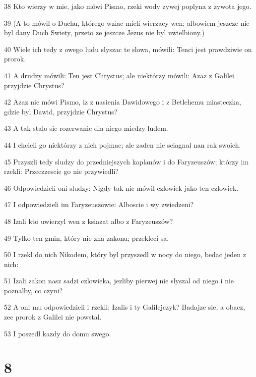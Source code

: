 \par 38 Kto wierzy w mie, jako mówi Pismo, rzeki wody zywej poplyna z zywota jego.
\par 39 (A to mówil o Duchu, którego wziac mieli wierzacy wen; albowiem jeszcze nie byl dany Duch Swiety, przeto ze jeszcze Jezus nie byl uwielbiony.)
\par 40 Wiele ich tedy z owego ludu slyszac te slowa, mówili: Tenci jest prawdziwie on prorok.
\par 41 A drudzy mówili: Ten jest Chrystus; ale niektórzy mówili: Azaz z Galilei przyjdzie Chrystus?
\par 42 Azaz nie mówi Pismo, iz z nasienia Dawidowego i z Betlehemu miasteczka, gdzie byl Dawid, przyjdzie Chrystus?
\par 43 A tak stalo sie rozerwanie dla niego miedzy ludem.
\par 44 I chcieli go niektórzy z nich pojmac; ale zaden nie sciagnal nan rak swoich.
\par 45 Przyszli tedy sludzy do przedniejszych kaplanów i do Faryzeuszów; którzy im rzekli: Przeczzescie go nie przywiedli?
\par 46 Odpowiedzieli oni sludzy: Nigdy tak nie mówil czlowiek jako ten czlowiek.
\par 47 I odpowiedzieli im Faryzeuszowie: Alboscie i wy zwiedzeni?
\par 48 Izali kto uwierzyl wen z ksiazat albo z Faryzeuszów?
\par 49 Tylko ten gmin, który nie zna zakonu; przekleci sa.
\par 50 I rzekl do nich Nikodem, który byl przyszedl w nocy do niego, bedac jeden z nich:
\par 51 Izali zakon nasz sadzi czlowieka, jezliby pierwej nie slyszal od niego i nie poznalby, co czyni?
\par 52 A oni mu odpowiedzieli i rzekli: Izalis i ty Galilejczyk? Badajze sie, a obacz, zec prorok z Galilei nie powstal.
\par 53 I poszedl kazdy do domu swego.

\chapter{8}

